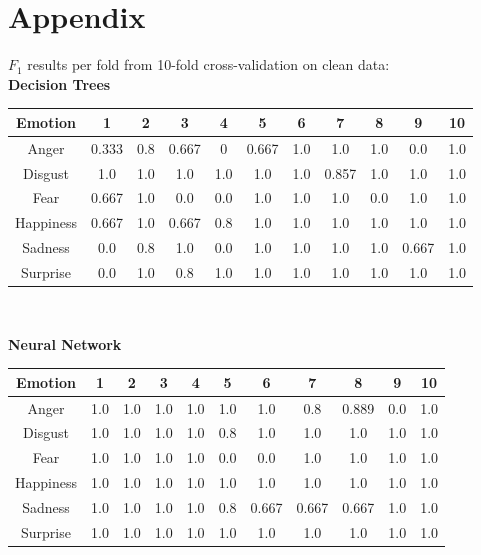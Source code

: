 \documentclass[a4paper]{article}
\begin{document}
\newpage 
\section{Appendix}

$F_1$ results per fold from 10-fold cross-validation on clean data:\\

{\bf Decision Trees}\\

\begin{center}
  \begin{tabular}{|c|cccccccccc|}
  \hline
    Emotion & 1 & 2 & 3 & 4 & 5 & 6 & 7 & 8 & 9 & 10 \\
    \hline
    Anger 	& 0.333 & 0.8 & 0.667 & 0 & 0.667 & 1.0 & 1.0 & 1.0 & 0.0 & 1.0 \\
	Disgust & 1.0 & 1.0 & 1.0 & 1.0 & 1.0 & 1.0 & 0.857 & 1.0 & 1.0 & 1.0 \\
	Fear 	& 0.667 & 1.0 & 0.0 & 0.0 & 1.0 & 1.0 & 1.0 & 0.0 & 1.0 & 1.0 \\
	Happiness 	& 0.667 & 1.0 & 0.667 & 0.8 & 1.0 & 1.0 & 1.0 & 1.0 & 1.0 & 1.0 \\
	Sadness 	& 0.0 & 0.8 & 1.0 & 0.0 & 1.0 & 1.0 & 1.0 & 1.0 & 0.667 & 1.0 \\
	Surprise 	& 0.0 & 1.0 & 0.8 & 1.0 & 1.0 & 1.0 & 1.0 & 1.0 & 1.0 & 1.0 \\
	\hline
  \end{tabular}\\
  \end{center}
  
 {\bf Neural Network}\\

\begin{center}
  \begin{tabular}{|c|cccccccccc|}
  \hline
    Emotion & 1 & 2 & 3 & 4 & 5 & 6 & 7 & 8 & 9 & 10 \\
    \hline
    Anger 	& 1.0 & 1.0 & 1.0 & 1.0 & 1.0 & 1.0 & 0.8 & 0.889 & 0.0 & 1.0 \\
	Disgust & 1.0 & 1.0 & 1.0 & 1.0 & 0.8 & 1.0 & 1.0 & 1.0 & 1.0 & 1.0 \\
	Fear 	& 1.0 & 1.0 & 1.0 & 1.0 & 0.0 & 0.0 & 1.0 & 1.0 & 1.0 & 1.0 \\
	Happiness 	& 1.0 & 1.0 & 1.0 & 1.0 & 1.0 & 1.0 & 1.0 & 1.0 & 1.0 & 1.0 \\
	Sadness 	& 1.0 & 1.0 & 1.0 & 1.0 & 0.8 & 0.667 & 0.667 & 0.667 & 1.0 & 1.0 \\
	Surprise 	& 1.0 & 1.0 & 1.0 & 1.0 & 1.0 & 1.0 & 1.0 & 1.0 & 1.0 & 1.0 \\
	\hline
  \end{tabular}\\
  \end{center}
  
\end{document}

